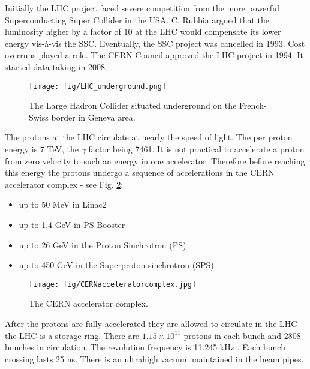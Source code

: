 Initially the LHC project faced severe competition from the more powerful Superconducting Super Collider in the USA. C. Rubbia argued that the luminosity higher by a factor of 10 at the LHC would compensate its lower energy vis-à-vis the SSC. Eventually, the SSC project was cancelled in 1993. Cost overruns played a role. The CERN Council approved the LHC project in 1994. It started data taking in 2008.

\begin{figure}[htpb]
  \centering
  \texttt{[image: fig/LHC\_underground.png]}
  \caption{The Large Hadron Collider situated underground on the French-Swiss border in Geneva area.}
  \label{fig:LHC_underground}
\end{figure}

The protons at the LHC circulate at nearly the speed of light. The per proton energy is 7 TeV, the $\gamma$ factor being 7461. It is not practical to accelerate a proton from zero velocity to such an energy in one accelerator. Therefore before reaching this energy the protons undergo a sequence of accelerations in the CERN accelerator complex - see Fig. \ref{fig:CERN_accelerator_complex}:

\begin{itemize}
\item up to 50 MeV in Linac2
\item up to 1.4 GeV in PS Booster
\item up to 26 GeV in the Proton Sinchrotron (PS)
\item up to 450 GeV in the Superproton sinchrotron (SPS)
\end{itemize}

\begin{figure}[htpb]
  \centering
  \texttt{[image: fig/CERNacceleratorcomplex.jpg]}
  \caption{The CERN accelerator complex.}
  \label{fig:CERN_accelerator_complex}
\end{figure}

After the protons are fully accelerated they are allowed to circulate in the LHC - the LHC is a storage ring. There are $1.15\times10^{11}$ protons in each bunch and 2808 bunches in circulation. The revolution frequency is 11.245 kHz \cite{Bruning:2004ej}. Each bunch crossing lasts 25 ns. There is an ultrahigh vacuum maintained in the beam pipes.

